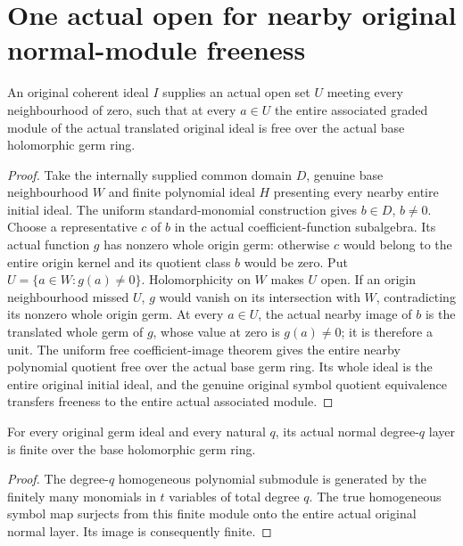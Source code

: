 \section{One actual open for nearby original normal-module freeness}

\begin{theorem}
\label{hir:relative-normal-coefficient-algebra-nearby-associated-free-open}
\leanok
{}
An original coherent ideal $I$ supplies an actual open set $U$ meeting
every neighbourhood of zero, such that at every $a\in U$ the entire
associated graded module of the actual translated original ideal is free over
the actual base holomorphic germ ring.
\end{theorem}
\begin{proof}
Take the internally supplied common domain $D$, genuine base neighbourhood
$W$ and finite polynomial ideal $H$ presenting every nearby entire initial
ideal. The uniform standard-monomial construction gives $b\in D$, $b\ne0$.
Choose a representative $c$ of $b$ in the actual coefficient-function
subalgebra. Its actual function $g$ has nonzero whole origin germ: otherwise
$c$ would belong to the entire origin kernel and its quotient class $b$
would be zero. Put $U=\{a\in W:g(a)\ne0\}$. Holomorphicity on $W$
makes $U$ open. If an origin neighbourhood missed $U$, $g$ would vanish
on its intersection with $W$, contradicting its nonzero whole origin germ.
At every $a\in U$, the actual nearby image of $b$ is the translated
whole germ of $g$, whose value at zero is $g(a)\ne0$; it is therefore
a unit. The uniform free coefficient-image theorem gives the entire nearby
polynomial quotient free over the actual base germ ring. Its whole ideal is
the entire original initial ideal, and the genuine original symbol quotient
equivalence transfers freeness to the entire actual associated module.
\end{proof}

\begin{lemma}
\label{hir:relative-normal-original-normal-layer-finite}
\leanok
{}
For every original germ ideal and every natural $q$, its actual normal
degree-$q$ layer is finite over the base holomorphic germ ring.
\end{lemma}
\begin{proof}
The degree-$q$ homogeneous polynomial submodule is generated by the finitely
many monomials in $t$ variables of total degree $q$. The true homogeneous
symbol map surjects from this finite module onto the entire actual original
normal layer. Its image is consequently finite.
\end{proof}

